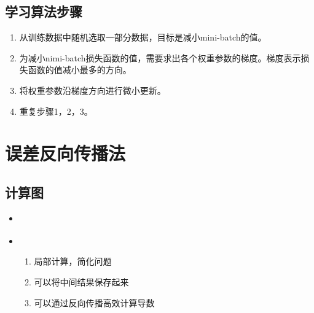 \documentclass[letterpaper,10pt,english]{sphinxmanual}
\begin{document}
\section{学习算法步骤}
\label{\detokenize{_u795e_u7ecf_u7f51_u7edc_u7684_u5b66_u4e60:id5}}\begin{enumerate}
\item {} 
  从训练数据中随机选取一部分数据，目标是减小mini-batch的值。

\item {} 
 为减小nimi-batch损失函数的值，需要求出各个权重参数的梯度。梯度表示损失函数的值减小最多的方向。

\item {} 
 将权重参数沿梯度方向进行微小更新。

\item {} 
 重复步骤1，2，3。

\end{enumerate}


\chapter{误差反向传播法}
\label{\detokenize{_u8bef_u5dee_u53cd_u5411_u4f20_u64ad_u6cd5:id1}}\label{\detokenize{_u8bef_u5dee_u53cd_u5411_u4f20_u64ad_u6cd5::doc}}

\section{计算图}
\label{\detokenize{_u8bef_u5dee_u53cd_u5411_u4f20_u64ad_u6cd5:id2}}\begin{itemize}
\item {} 
\begin{quote}

\noindent{}
\end{quote}

\item {} 
\begin{enumerate}
\item {} 
局部计算，简化问题

\item {} 
可以将中间结果保存起来

\item {} 
可以通过反向传播高效计算导数

\end{enumerate}

\end{itemize}
\end{document}
